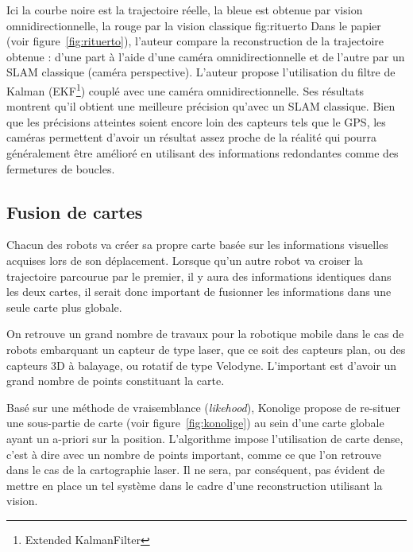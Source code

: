 {Ici la courbe noire est la trajectoire réelle, la bleue est obtenue par vision omnidirectionnelle, la rouge par la vision classique} {fig:rituerto}
Dans le papier \cite{Rituerto10} (voir figure~\ref{fig:rituerto}), l'auteur compare la reconstruction de la trajectoire obtenue : d'une part à l'aide d'une caméra omnidirectionnelle et de l'autre par un SLAM classique (caméra perspective).
L'auteur propose l'utilisation du filtre de Kalman (EKF\footnote{Extended KalmanFilter}) couplé avec une caméra omnidirectionnelle.
Ses résultats montrent qu'il obtient une meilleure précision qu'avec un SLAM classique.
Bien que les précisions atteintes soient encore loin des capteurs tels que le GPS, les caméras permettent d'avoir un résultat assez proche de la réalité qui pourra généralement être amélioré en utilisant des informations redondantes comme des fermetures de boucles.


\subsection{Fusion de cartes}

Chacun des robots va créer sa propre carte basée sur les informations visuelles acquises lors de son déplacement.
Lorsque qu'un autre robot va croiser la trajectoire parcourue par le premier, il y aura des informations identiques dans les deux cartes, il serait donc important de fusionner les informations dans une seule carte plus globale.

On retrouve un grand nombre de travaux pour la robotique mobile dans le cas de robots embarquant un capteur de type laser, que ce soit des capteurs plan, ou des capteurs 3D à balayage, ou rotatif de type Velodyne.
L'important est d'avoir un grand nombre de points constituant la carte.

Basé sur une méthode de vraisemblance (\textit{likehood}), Konolige \cite{Konolige03} propose de re-situer une sous-partie de carte (voir figure~\ref{fig:konolige}) au sein d'une carte globale ayant un a-priori sur la position.
L'algorithme impose l'utilisation de carte dense, c'est à dire avec un nombre de points important, comme ce que l'on retrouve dans le cas de la cartographie laser.
Il ne sera, par conséquent, pas évident de mettre en place un tel système dans le cadre d'une reconstruction utilisant la vision.

